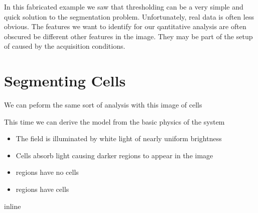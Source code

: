 \documentclass[letterpaper,10pt,english]{sphinxmanual}
\begin{document}
\noindent{}

\sphinxAtStartPar
In this fabricated example we saw that thresholding can be a very simple and quick solution to the segmentation problem. Unfortunately, real data is often less obvious. The features we want to identify for our qantitative analysis are often obscured be different other features in the image. They may be part of the setup of caused by the acquisition conditions.


\chapter{Segmenting Cells}
\label{\detokenize{04-BasicSegmentation:segmenting-cells}}
\sphinxAtStartPar
We can peform the same sort of analysis with this image of cells

\sphinxAtStartPar
This time we can derive the model from the basic physics of the system
\begin{itemize}
\item {} 
\sphinxAtStartPar
The field is illuminated by white light of nearly uniform brightness

\item {} 
\sphinxAtStartPar
Cells absorb light causing darker regions to appear in the image

\item {} 
\sphinxAtStartPar
{} regions have no cells

\item {} 
\sphinxAtStartPar
{} regions have cells

\end{itemize}

\begin{sphinxVerbatim}[commandchars=\\\{\}]
 inline
   
   
   
\end{sphinxVerbatim}
\end{document}
